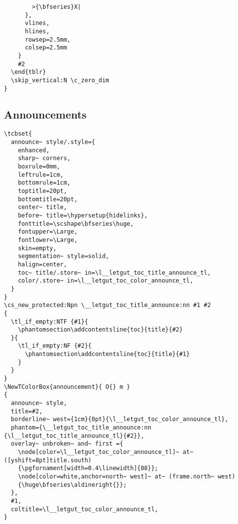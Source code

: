 \documentclass{letgut}
\begin{document}
\begin{lstlisting}
        >{\bfseries}X|
      },
      vlines,
      hlines,
      rowsep=2.5mm,
      colsep=2.5mm
    }
    #2
  \end{tblr}
  \skip_vertical:N \c_zero_dim
}
\end{lstlisting}

\subsection{Announcements}
\label{ImplementationAnnounces-nahckb909pj0}
\begin{lstlisting}
\tcbset{
  announce~ style/.style={
    enhanced,
    sharp~ corners,
    boxrule=0mm,
    leftrule=1cm,
    bottomrule=1cm,
    toptitle=20pt,
    bottomtitle=20pt,
    center~ title,
    before~ title=\hypersetup{hidelinks},
    fonttitle=\scshape\bfseries\huge,
    fontupper=\Large,
    fontlower=\Large,
    skin=empty,
    segmentation~ style=solid,
    halign=center,
    toc~ title/.store~ in=\l__letgut_toc_title_announce_tl,
    color/.store~ in=\l__letgut_toc_color_announce_tl,
  }
}
\cs_new_protected:Npn \__letgut_toc_title_announce:nn #1 #2
{
  \tl_if_empty:NTF {#1}{
    \phantomsection\addcontentsline{toc}{title}{#2}
  }{
    \tl_if_empty:NF {#2}{
      \phantomsection\addcontentsline{toc}{title}{#1}
    }
  }
}
\NewTColorBox{announcement}{ O{} m }
{
  announce~ style,
  title=#2,
  borderline~ west={1cm}{0pt}{\l__letgut_toc_color_announce_tl},
  phantom={\__letgut_toc_title_announce:nn {\l__letgut_toc_title_announce_tl}{#2}},
  overlay~ unbroken~ and~ first ={
    \node[color=\l__letgut_toc_color_announce_tl]~ at~ ([yshift=8pt]title.south)
    {\pgfornament[width=0.4\linewidth]{88}};
    \node[color=white,anchor=north~ west]~ at~ (frame.north~ west)
    {\huge\bfseries\aldineright{}};
  },
  #1,
  coltitle=\l__letgut_toc_color_announce_tl,
}
\end{lstlisting}
\end{document}
